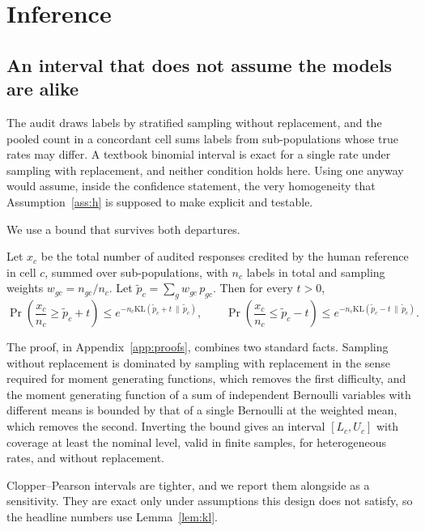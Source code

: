 
\section{Inference}
\label{sec:inference}

\subsection{An interval that does not assume the models are alike}

The audit draws labels by stratified sampling without replacement, and the pooled count in a
concordant cell sums labels from sub-populations whose true rates may differ. A textbook
binomial interval is exact for a single rate under sampling with replacement, and neither
condition holds here. Using one anyway would assume, inside the confidence statement, the
very homogeneity that Assumption~\ref{ass:h} is supposed to make explicit and testable.

We use a bound that survives both departures.

\begin{lemma}
\label{lem:kl}
Let $x_c$ be the total number of audited responses credited by the human reference in cell
$c$, summed over sub-populations, with $n_c$ labels in total and sampling weights
$w_{gc} = n_{gc}/n_c$. Let $\tilde p_c = \sum_g w_{gc}\, p_{gc}$. Then for every $t > 0$,
\[
\Pr\!\left(\frac{x_c}{n_c} \ge \tilde p_c + t\right) \le e^{-n_c \mathrm{KL}(\tilde p_c + t \,\|\, \tilde p_c)},
\qquad
\Pr\!\left(\frac{x_c}{n_c} \le \tilde p_c - t\right) \le e^{-n_c \mathrm{KL}(\tilde p_c - t \,\|\, \tilde p_c)} .
\]
\end{lemma}

The proof, in Appendix~\ref{app:proofs}, combines two standard facts. Sampling without
replacement is dominated by sampling with replacement in the sense required for moment
generating functions, which removes the first difficulty, and the moment generating function
of a sum of independent Bernoulli variables with different means is bounded by that of a
single Bernoulli at the weighted mean, which removes the second. Inverting the bound gives an
interval $[L_c, U_c]$ with coverage at least the nominal level, valid in finite samples, for
heterogeneous rates, and without replacement.

Clopper--Pearson intervals are tighter, and we report them alongside as a sensitivity.
They are exact only under assumptions this design does not satisfy, so the headline numbers
use Lemma~\ref{lem:kl}.


